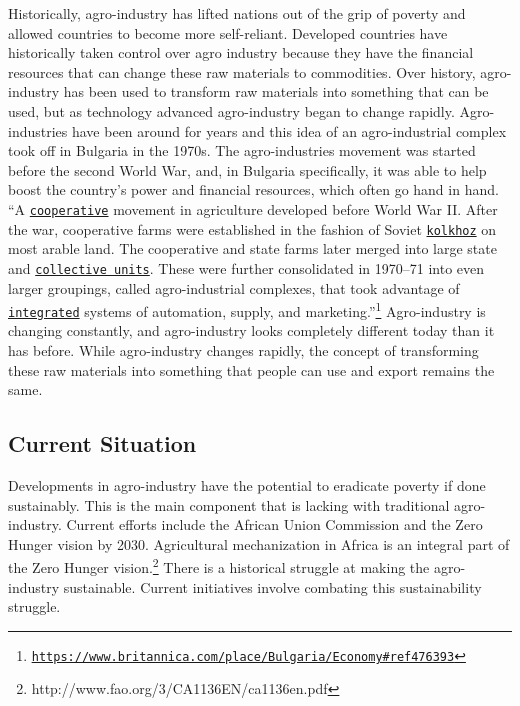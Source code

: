 \documentclass[10pt, letterpaper]{article}
\begin{document}
Historically, agro-industry has lifted nations out of the grip of
poverty and allowed countries to become more self-reliant. Developed
countries have historically taken control over agro industry because
they have the financial resources that can change these raw materials to
commodities. Over history, agro-industry has been used to transform raw
materials into something that can be used, but as technology advanced
agro-industry began to change rapidly. Agro-industries have been around
for years and this idea of an agro-industrial complex took off in
Bulgaria in the 1970s. The agro-industries movement was started before
the second World War, and, in Bulgaria specifically, it was able to help
boost the country's power and financial resources, which often go hand
in hand. ``A
\texttt{\href{https://www.britannica.com/topic/cooperative}{cooperative}}
movement in agriculture developed before World War II. After the war,
cooperative farms were established in the fashion of Soviet
\texttt{\href{https://www.britannica.com/topic/kolkhoz}{kolkhoz}} on most arable
land. The cooperative and state farms later merged into large state and
\texttt{\href{https://www.britannica.com/topic/collectivization}{collective
units}}. These were further consolidated in 1970--71 into even larger
groupings, called agro-industrial complexes, that took advantage of
\texttt{\href{https://www.merriam-webster.com/dictionary/integrated}{integrated}}
systems of automation, supply, and marketing.''\footnote{\texttt{\href{https://www.britannica.com/place/Bulgaria/Economy\#ref476393}{\underline{https://www.britannica.com/place/Bulgaria/Economy\#ref476393}}}}
Agro-industry is changing constantly, and agro-industry looks completely
different today than it has before. While agro-industry changes rapidly,
the concept of transforming these raw materials into something that
people can use and export remains the same.

\subsection{Current Situation}

Developments in agro-industry have the potential to eradicate poverty if
done sustainably. This is the main component that is lacking with
traditional agro-industry. Current efforts include the African Union
Commission and the Zero Hunger vision by 2030. Agricultural
mechanization in Africa is an integral part of the Zero Hunger
vision.\footnote{http://www.fao.org/3/CA1136EN/ca1136en.pdf} There is a
historical struggle at making the agro-industry sustainable. Current
initiatives involve combating this sustainability struggle. \\
\end{document}
